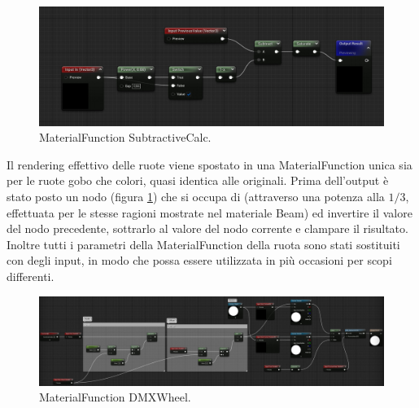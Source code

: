 \documentclass[main.tex]{subfiles}
\begin{document}
\clearpage

\begin{figure}
    \centering
    \captionsetup{justification=centering}
    \includegraphics[scale=0.26]{img/renderingPipeline/SubtractiveCalcFull.jpg}
    \caption{MaterialFunction SubtractiveCalc.}
    \label{fig:2_SubtractiveCalc}
\end{figure}
Il rendering effettivo delle ruote viene spostato in una MaterialFunction unica sia per le ruote gobo che colori, quasi identica alle originali. Prima dell'output è stato posto un nodo  (figura \ref{fig:2_SubtractiveCalc}) che si occupa di  (attraverso una potenza alla $1/3$, effettuata per le stesse ragioni mostrate nel materiale Beam) ed invertire il valore del nodo precedente, sottrarlo al valore del nodo corrente e clampare il risultato. \newline
Inoltre tutti i parametri della MaterialFunction della ruota sono stati sostituiti con degli input, in modo che possa essere utilizzata in più occasioni per scopi differenti.
\begin{figure}[H]
    \centering
    \includegraphics[width=1\linewidth]{img/renderingPipeline/DMXWheelFuul.jpg}
    \caption{MaterialFunction DMXWheel.}
    \label{fig:2_dmxWheel}
\end{figure}
\end{document}
